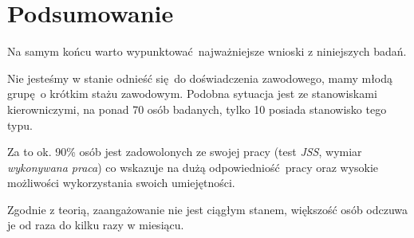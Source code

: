 \section{Podsumowanie}
Na samym końcu warto wypunktować najważniejsze wnioski z niniejszych badań.

Nie jesteśmy w stanie odnieść się do doświadczenia zawodowego, mamy młodą grupę o krótkim stażu zawodowym. Podobna sytuacja jest ze stanowiskami kierowniczymi, na ponad 70 osób badanych, tylko 10 posiada stanowisko tego typu.

Za to ok. 90\% osób jest zadowolonych ze swojej pracy (test \emph{JSS}, wymiar \textit{wykonywana praca}) co wskazuje na dużą odpowiedniość pracy oraz wysokie możliwości wykorzystania swoich umiejętności.

Zgodnie z teorią, zaangażowanie nie jest ciągłym stanem, większość osób odczuwa je od raza do kilku razy w miesiącu.  
